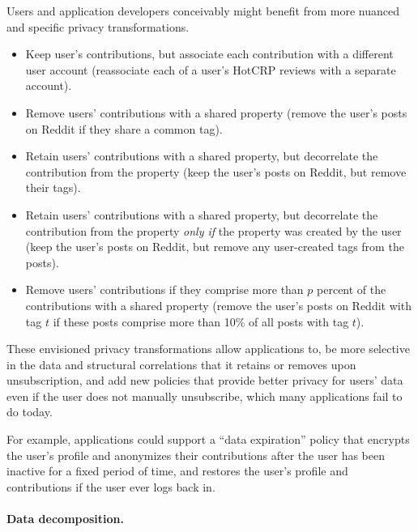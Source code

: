 %
Users and application developers conceivably might benefit from more nuanced and specific
privacy transformations.
%
\begin{itemize}[nosep]
    \item Keep user's contributions, but associate each contribution with a different user account
        (\eg reassociate each of a user's HotCRP reviews with a separate account).
    \item Remove users' contributions with a shared property (\eg remove the user's
       posts on Reddit if they share a common tag).
    \item Retain users' contributions with a shared property, but decorrelate the contribution
        from the property (\eg keep the user's posts on Reddit, but remove their tags).
    \item Retain users' contributions with a shared property, but decorrelate the contribution
        from the property \emph{only if} the property was created by
        the user (\eg keep the user's posts on Reddit, but remove any user-created tags from the posts).
    \item Remove users' contributions if they comprise more than $p$ percent of the contributions
        with a shared property (\eg remove the user's posts on Reddit with tag $t$ if
        these posts comprise more than 10\% of all posts with tag $t$).
\end{itemize}

These envisioned privacy transformations allow applications to, \eg be more selective in the data and structural
correlations that it retains or removes upon unsubscription, and add new policies that provide
better privacy for users' data even if the user does not manually unsubscribe, which many applications
fail to do today.

For example, applications could support a ``data expiration'' policy that encrypts the user's
profile and anonymizes their contributions after the user has been inactive for a fixed period of
time, and restores the user's profile and contributions if the user ever logs back in.

\paragraph{Data decomposition.}
%

